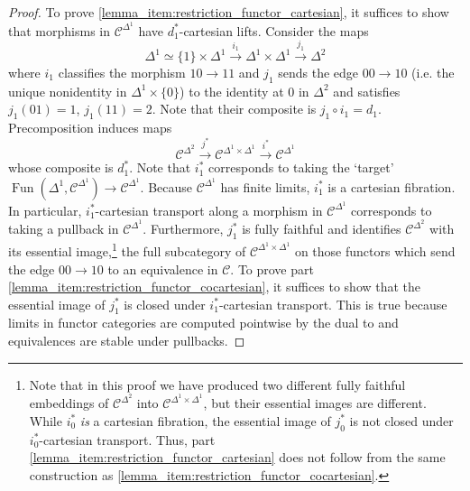 \documentclass{article}
\DeclareMathOperator{\Fun}{Fun} %
\theoremstyle{definition}
\begin{document}
\begin{proof}
    To prove \ref{lemma_item:restriction_functor_cartesian}, it suffices to show that morphisms in $ \mathcal{C}^{\Delta^1} $ have $ d_1^*$-cartesian lifts. 
    Consider the maps 
    \begin{equation*}
        \Delta^1 \simeq \{1\} \times \Delta^1 \xrightarrow{i_1} \Delta^1 \times \Delta^1 \xrightarrow{j_1} \Delta^2
    \end{equation*}
    where $ i_1 $ classifies the morphism $ 10 \to 11 $ and $ j_1 $ sends the edge $ 00 \to 10 $ (i.e. the unique nonidentity in $ \Delta^1 \times \{0\} $) to the identity at $ 0 $ in $ \Delta^2 $ and satisfies $ j_1(01) = 1 $, $ j_1(11) = 2 $. 
    Note that their composite is $ j_1 \circ i_1 = d_1 $. 
    Precomposition induces maps 
    \begin{equation*}
        \mathcal{C}^{\Delta^2} \xrightarrow{j^*} \mathcal{C}^{\Delta^1 \times \Delta^1} \xrightarrow{i^*} \mathcal{C}^{\Delta^1}
    \end{equation*}  
    whose composite is $ d_1^* $. 
    Note that $ i^*_1 $ corresponds to taking the `target' $ \Fun\left(\Delta^1,\mathcal{C}^{\Delta^1}\right) \to \mathcal{C}^{\Delta^1} $. 
    Because $ \mathcal{C}^{\Delta^1} $ has finite limits, $ i^*_1 $ is a cartesian fibration. 
    In particular, $ i^*_1 $-cartesian transport along a morphism in $ \mathcal{C}^{\Delta^1} $ corresponds to taking a pullback in $ \mathcal{C}^{\Delta^1} $. 
    Furthermore, $ j^*_1 $ is fully faithful and identifies $ \mathcal{C}^{\Delta^2} $ with its essential image,\footnote{Note that in this proof we have produced two different fully faithful embeddings of $ \mathcal{C}^{\Delta^2} $ into $ \mathcal{C}^{\Delta^1 \times \Delta^1} $, but their essential images are different. While $ i_0^* $ \emph{is} a cartesian fibration, the essential image of $ j_0^* $ is not closed under $ i_0^* $-cartesian transport. Thus, part \ref{lemma_item:restriction_functor_cartesian} does not follow from the same construction as \ref{lemma_item:restriction_functor_cocartesian}. } the full subcategory of $ \mathcal{C}^{\Delta^1 \times \Delta^1} $ on those functors which send the edge $ 00 \to 10 $ to an equivalence in $ \mathcal{C} $. 
    To prove part \ref{lemma_item:restriction_functor_cocartesian}, it suffices to show that the essential image of $ j^*_1 $ is closed under $ i^*_1 $-cartesian transport. 
    This is true because limits in functor categories are computed pointwise by the dual to \cite[Corollary 5.1.2.3]{HTT} and equivalences are stable under pullbacks.  
\end{proof}
\end{document}
